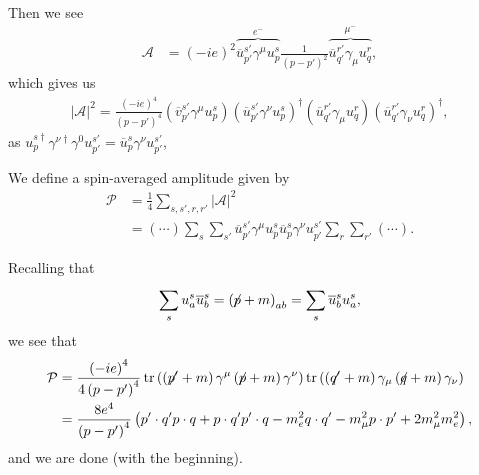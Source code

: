 Then we see
\begin{align}
    \mathcal{A} &= \left( -ie \right)^2 \overbrace{\overline{u}^{s'}_{p'} \gamma^{\mu}u^{s}_p}^{e^{-}} \frac{1}{\left( p - p' \right)^2} \overbrace{\overline{u}^{r'}_{q'} \gamma_\mu u^{r}_q}^{\mu^{-}}
,\end{align}
which gives us
\begin{align}
    \left| \mathcal{A} \right|^2 = \frac{\left( -ie \right)^4}{\left( p - p' \right)^{4}} \left( \overline{v}^{s'}_{p'} \gamma^{\mu} u^{s}_p \right) \left( \overline{u}^{s'}_{p'} \gamma^{\nu} u^{s}_p \right)^{\dag} \left( \overline{u}^{r'}_{q'} \gamma_{\mu} u^{r}_q \right) \left( \overline{u}^{r'}_{q'} \gamma_\nu u^{r}_q \right)^{\dag}
,\end{align}
as $u^{s \dagger}_{p} \gamma^{\nu \dagger} \gamma^{0} u^{s'}_{p'} = \overline{u}^{s}_p \gamma^{\nu} u^{s'}_{p'}$,

We define a spin-averaged amplitude given by
\begin{align}
    \mathcal{P} &= \frac{1}{4} \sum_{s,s',r,r'}^{} \left| \mathcal{A} \right|^2 \\
    &= \left( \cdots \right) \sum_{s}^{} \sum_{s'}^{} \overline{u}^{s'}_{p'} \gamma^{\mu} u^{s}_p \overline{u}^{s}_p \gamma^{\nu} u^{s'}_{p'} \sum_{r}^{}  \sum_{r'}^{}  \left( \cdots \right) 
.\end{align}

Recalling that
\begin{align}
    \sum_{s}^{} u^{s}_a \overline{u}^{s}_b =  \left( \fbs{p} + m \right)_{ab} = \sum_{s}^{} \overline{u}^{s}_b u^{s}_a
,\end{align}
we see that
\begin{align}
    \mathcal{P} &= \frac{\left( -ie \right)^{4}}{4\left( p - p' \right)^{4}}\tr \left( \left( \fbs{p'} + m \right) \gamma^{\mu} \left( \fbs{p} + m \right) \gamma^{\nu} \right) \tr \left( \left( \fbs{q'} + m \right) \gamma_\mu \left( \fbs{q} + m \right) \gamma_\nu \right)  \\
    &= \frac{8e^{4}}{\left( p - p' \right)^{4}} \left( p' \cdot q' p \cdot q + p \cdot q' p' \cdot q - m_e^2 q \cdot q' - m_\mu^2 p \cdot p' + 2 m_\mu^2 m_e^2 \right) 
,\end{align}
and we are done (with the beginning).
